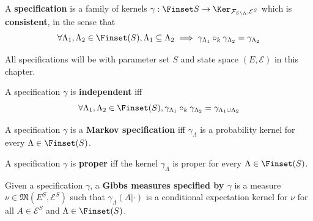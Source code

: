 \begin{definition}[Specification]
    \label{def:spec}
    \leanok{}

    A {\bf specification} is a family of kernels $\gamma : \Finset S \to \Ker_{\mathcal{F}_{S\setminus\Lambda}, \mathcal{E}^S}$ which is {\bf consistent}, in the sense that
    \[\forall \Lambda_1, \Lambda_2 \in \Finset(S), \Lambda_1 \subseteq \Lambda_2 \implies \gamma_{\Lambda_1} \circ_k \gamma_{\Lambda_2} = \gamma_{\Lambda_2}\]
\end{definition}

All specifications will be with parameter set $S$ and state space $(E, \mathcal{E})$ in this chapter.

\begin{definition}
    \label{def:indep-spec}
    \leanok{}

    A specification $\gamma$ is \textbf{independent} iff
    \[\forall \Lambda_1, \Lambda_2 \in \Finset(S), \gamma_{\Lambda_1} \circ_k \gamma_{\Lambda_2} = \gamma_{\Lambda_1\cup\Lambda_2}\]
\end{definition}

\begin{definition}
    \label{def:markov-spec}
    \leanok{}

    A specification $\gamma$ is a \textbf{Markov specification} iff $\gamma_\Lambda$ is a probability kernel for every $\Lambda \in \Finset(S)$.
\end{definition}

\begin{definition}
    \label{def:proper-spec}
    \leanok{}

    A specification $\gamma$ is \textbf{proper} iff the kernel $\gamma_\Lambda$ is proper for every $\Lambda \in \Finset(S)$.
\end{definition}

\begin{definition}
    \label{def:gibbs-meas}
    \leanok
    Given a specification $\gamma$, a \textbf{Gibbs measures specified by $\gamma$} is a measure $\nu \in \mathfrak{M}(E^S, \mathcal{E}^S)$ such that $\gamma_\Lambda(A|\cdot)$ is a conditional expectation kernel for $\nu$ for all $A \in \mathcal E^S$ and $\Lambda \in \Finset(S)$.
\end{definition}

